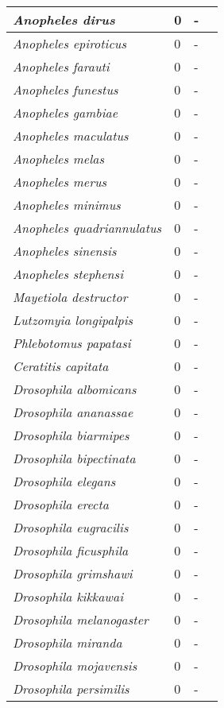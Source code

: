 {\begin{longtable}{| L{4cm} | L{2cm}  | L{5cm} | L{4cm} |}
\textit{Anopheles dirus} & 0 & - & \\ \hline
\textit{Anopheles epiroticus} & 0 & - & \\ \hline
\textit{Anopheles farauti} & 0 & - & \\ \hline
\textit{Anopheles funestus} & 0 & - & \\ \hline
\textit{Anopheles gambiae} & 0 & - & \\ \hline
\textit{Anopheles maculatus} & 0 & - & \\ \hline
\textit{Anopheles melas} & 0 & - & \\ \hline
\textit{Anopheles merus} & 0 & - & \\ \hline
\textit{Anopheles minimus} & 0 & - & \\ \hline
\textit{Anopheles quadriannulatus} & 0 & - & \\ \hline
\textit{Anopheles sinensis} & 0 & - & \\ \hline
\textit{Anopheles stephensi} & 0 & - & \\ \hline
\textit{Mayetiola destructor} & 0 & - & \\ \hline
\textit{Lutzomyia longipalpis} & 0 & - & \\ \hline
\textit{Phlebotomus papatasi} & 0 & - & \\ \hline
\textit{Ceratitis capitata} & 0 & - & \\ \hline
\textit{Drosophila albomicans} & 0 & - & \\ \hline
\textit{Drosophila ananassae} & 0 & - & \\ \hline
\textit{Drosophila biarmipes} & 0 & - & \\ \hline
\textit{Drosophila bipectinata} & 0 & - & \\ \hline
\textit{Drosophila elegans} & 0 & - & \\ \hline
\textit{Drosophila erecta} & 0 & - & \\ \hline
\textit{Drosophila eugracilis} & 0 & - & \\ \hline
\textit{Drosophila ficusphila} & 0 & - & \\ \hline
\textit{Drosophila grimshawi} & 0 & - & \\ \hline
\textit{Drosophila kikkawai} & 0 & - & \\ \hline
\textit{Drosophila melanogaster} & 0 & - & \\ \hline
\textit{Drosophila miranda} & 0 & - & \\ \hline
\textit{Drosophila mojavensis} & 0 & - & \\ \hline
\textit{Drosophila persimilis} & 0 & - & \\ \hline

\end{longtable}}
